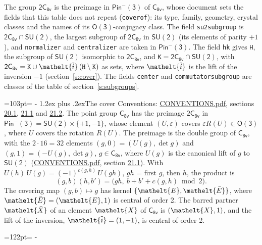 \documentclass[10pt,a4paper]{article}
\makeatletter
\renewcommand\section{\@startsection{section}{1}{\z@}{-3ex plus -1ex minus -.2ex}%
  {1.2ex plus .2ex}{\normalfont\large\sffamily\bfseries\color{parttitle}}}
\newcommand{\needspace}[1]{\par\penalty-100\begingroup\dimen0=#1\relax\dimen2=\pagegoal
  \advance\dimen2-\pagetotal\ifdim\dimen0>\dimen2\relax\ifdim\dimen2>0pt\vfil\break\fi\fi
  \endgroup}
\numberwithin{equation}{section}
\newcommand{\eltfont}[1]{{\let\sigma\eltsigma\mathelt{#1}}}
\newcommand{\grp}[1]{\mathsf{#1}}
\newcommand{\elt}[1]{\eltfont{#1}}
\newcommand{\dirprod}{\times}
\newcommand{\barred}[1]{\bar{#1}}
\newcommand{\lift}[1]{\tilde{#1}}
\makeatother
\begin{document}
\leavevmode\label{n:element.inversion}\label{n:group.preimage}The group $\grp{2C_{8v}}$ is the preimage in $\grp{Pin^{-}(3)}$ of \href{../../../rotation/data/pdf/C8v.pdf}{$\grp{C_{8v}}$}, whose document sets the fields that this table does not repeat (\texttt{coverof}): its type, family, geometry, crystal classes and the names of its \href{../../../rotation/data/pdf/O3.pdf}{$\grp{O(3)}$}-conjugacy class. The field \texttt{su2subgroup} is $\grp{2C_{8v}} \cap \grp{SU(2)}$, the largest subgroup of $\grp{2C_{8v}}$ in $\grp{SU(2)}$ (its elements of parity $+1$), and \texttt{normalizer} and \texttt{centralizer} are taken in $\grp{Pin^{-}(3)}$. The field \texttt{hk} gives \texttt{H}, the subgroup of $\grp{SU(2)}$ isomorphic to $\grp{2C_{8v}}$, and \texttt{K}${} = \grp{2C_{8v}} \cap \grp{SU(2)}$, with $\grp{2C_{8v}} = \texttt{K} \cup \elt{\lift{i}}\,(\texttt{H} \setminus \texttt{K})$ as sets, where $\elt{\lift{i}}$ is the lift of the inversion $-1$ (section~\ref{s:cover}). The fields \texttt{center} and \texttt{commutatorsubgroup} are classes of the table of section~\ref{s:subgroups}.
\needspace{103pt}
\section{The cover}\label{s:cover}
Conventions: \href{../../CONVENTIONS.pdf}{CONVENTIONS.pdf}, sections \href{../../CONVENTIONS.pdf\#conv.20.1}{20.1}, \href{../../CONVENTIONS.pdf\#conv.21.1}{21.1} and \href{../../CONVENTIONS.pdf\#conv.21.2}{21.2}.
\leavevmode\label{n:group.pin.minus}\label{n:group.su2}\label{n:local.pin.sign}\label{n:matrix.covered}\label{n:matrix.lift.su2}\label{n:index.bar}The point group $\grp{C_{8v}}$ has the preimage $\grp{2C_{8v}}$ in $\grp{Pin^{-}(3)} = \grp{SU(2)} \dirprod \{+1, -1\}$, whose element $(U, \varepsilon)$ covers $\varepsilon R(U) \in \grp{O(3)}$, where $U$ covers the rotation $R(U)$. The preimage is the double group of $\grp{C_{8v}}$, with the $2 \cdot 16 = 32$ elements $(g, 0) = (U(g), \det g)$ and $(g, 1) = (-U(g), \det g)$, $g \in \grp{C_{8v}}$, where $U(g)$ is the canonical lift of $g$ to $\grp{SU(2)}$ (\href{../../CONVENTIONS.pdf}{CONVENTIONS.pdf}, section \href{../../CONVENTIONS.pdf\#conv.21.1}{21.1}). \label{n:function.cocycle}With $U(h)\,U(g) = (-1)^{c(g,h)}\,U(gh)$, $gh$ = first $g$, then $h$, the product is
\begin{equation}\label{e:product}(g, b)(h, b') = \bigl(gh,\ b + b' + c(g, h) \bmod 2\bigr).\end{equation}
\leavevmode\label{n:mark.bar}The covering map $(g, b) \mapsto g$ has kernel $\{\elt{E}, \elt{\barred{E}}\}$, where $\elt{\barred{E}} = (\elt{E}, 1)$ is central of order 2. \label{n:element.named}\label{n:mark.lift}The barred partner $\elt{\barred{X}}$ of an element $\elt{X}$ of $\grp{C_{8v}}$ is $(\elt{X}, 1)$, and the lift of the inversion, $\elt{\lift{i}} = (1, -1)$, is central of order 2.
\needspace{122pt}
\end{document}
